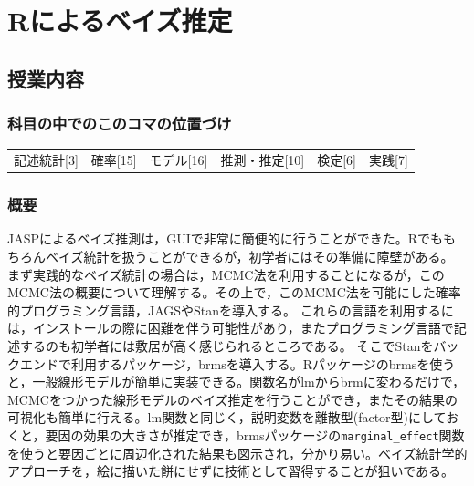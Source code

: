 \section{Rによるベイズ推定}
\label{s29_brms}

\subsection{授業内容}
\subsubsection{科目の中でのこのコマの位置づけ}
\begin{tabular}[t]{cccccc}
	記述統計[3] & 確率[15] & モデル[16] & 推測・推定[10] & 検定[6] & 実践[7]
\end{tabular}
\subsubsection{概要}
JASPによるベイズ推測は，GUIで非常に簡便的に行うことができた。Rでももちろんベイズ統計を扱うことができるが，初学者にはその準備に障壁がある。
まず実践的なベイズ統計の場合は，MCMC法を利用することになるが，このMCMC法の概要について理解する。その上で，このMCMC法を可能にした確率的プログラミング言語，JAGSやStanを導入する。
これらの言語を利用するには，インストールの際に困難を伴う可能性があり，またプログラミング言語で記述するのも初学者には敷居が高く感じられるところである。
そこでStanをバックエンドで利用するパッケージ，brmsを導入する。Rパッケージのbrmsを使うと，一般線形モデルが簡単に実装できる。関数名がlmからbrmに変わるだけで，MCMCをつかった線形モデルのベイズ推定を行うことができ，またその結果の可視化も簡単に行える。lm関数と同じく，説明変数を離散型(factor型)にしておくと，要因の効果の大きさが推定でき，brmsパッケージの\verb|marginal_effect|関数を使うと要因ごとに周辺化された結果も図示され，分かり易い。ベイズ統計学的アプローチを，絵に描いた餅にせずに技術として習得することが狙いである。
